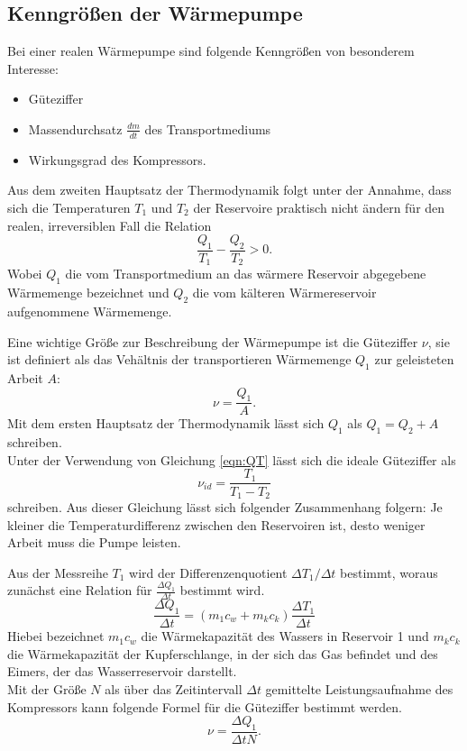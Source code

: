 \subsection{Kenngrößen der Wärmepumpe}
Bei einer realen Wärmepumpe sind folgende Kenngrößen von besonderem Interesse:
\begin{itemize}
  \item Güteziffer
  \item Massendurchsatz $\frac{dm}{dt}$ des Transportmediums
  \item Wirkungsgrad des Kompressors.
\end{itemize}

Aus dem zweiten Hauptsatz der Thermodynamik folgt unter der Annahme, dass sich die Temperaturen
$T_{1}$ und $T_{2}$ der Reservoire praktisch nicht ändern für den realen, irreversiblen Fall die Relation
\begin{equation}
  \frac{Q_{1}}{T_{1}}-\frac{Q_{2}}{T_{2}}>0.
  \label{eqn:QT}
\end{equation}
Wobei $Q_{1}$ die vom Transportmedium an das wärmere Reservoir abgegebene Wärmemenge bezeichnet und
$Q_{2}$ die vom kälteren Wärmereservoir aufgenommene Wärmemenge.

Eine wichtige Größe zur Beschreibung der Wärmepumpe ist die Güteziffer $\nu$, sie ist definiert
als das Vehältnis der transportieren Wärmemenge $Q_{1}$ zur geleisteten Arbeit $A$:
\begin{equation}
  \nu=\frac{Q_{1}}{A}.
  \label{eqn:güte}
\end{equation}
Mit dem ersten Hauptsatz der Thermodynamik lässt sich $Q_{1}$ als $Q_{1}=Q_{2}+A$ schreiben.\\
Unter der Verwendung von Gleichung \ref{eqn:QT} lässt sich die ideale Güteziffer als
\begin{equation}
  \nu_{id}=\frac{T_{1}}{T_{1}-T_{2}}
  \label{eqn:güte2}
\end{equation}
schreiben. Aus dieser Gleichung lässt sich folgender Zusammenhang folgern:
Je kleiner die Temperaturdifferenz zwischen den Reservoiren ist, desto weniger Arbeit muss
die Pumpe leisten.

Aus der Messreihe $T_{1}$ wird der Differenzenquotient $\Delta T_{1}/\Delta t$ bestimmt,
woraus zunächst eine Relation für $\frac{\Delta Q_{1}}{\Delta t}$ bestimmt wird.
\begin{equation}
  \frac{\Delta Q_{1}}{\Delta {t}}=(m_{1}c_{w}+m_{k}c_{k})\frac{\Delta T_{1}}{\Delta t}
\end{equation}
Hiebei bezeichnet $m_{1}c_{w}$ die Wärmekapazität des Wassers in Reservoir 1 und $m_{k}c_{k}$ die
Wärmekapazität der Kupferschlange, in der sich das Gas befindet und des Eimers, der das Wasserreservoir darstellt.\\
Mit der Größe $N$ als über das Zeitintervall $\Delta t$ gemittelte Leistungsaufnahme des Kompressors
kann folgende Formel für die Güteziffer bestimmt werden.
\begin{equation}
  \nu = \frac{\Delta Q_{1}}{\Delta t N}.
  \label{eqn:güte3}
\end{equation}

